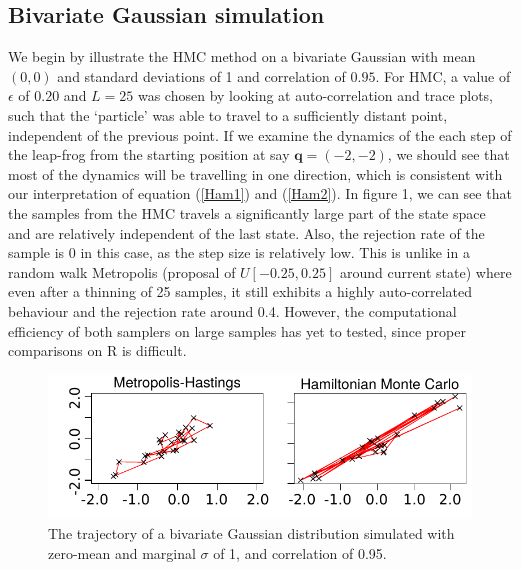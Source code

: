 \documentclass[11pt]{article}
\begin{document}
\subsection{Bivariate Gaussian simulation}
We begin by illustrate the HMC method on a bivariate Gaussian with mean $(0,0)$ and standard deviations of 1 and correlation of $0.95$. For HMC, a value of $\epsilon$ of $0.20$ and $L=25$ was chosen by looking at auto-correlation and trace plots, such that the `particle' was able to travel to a sufficiently distant point, independent of the previous point. If we examine the dynamics of the each step of the leap-frog from the starting position at say $\mathbf{q}=(-2,-2)$, we should see that most of the dynamics will be travelling in one direction, which is consistent with our interpretation of equation (\ref{Ham1}) and (\ref{Ham2}). In figure 1, we can see that the samples from the HMC travels a significantly large part of the state space and are relatively independent of the last state. Also, the rejection rate of the sample is 0 in this case, as the step size is relatively low. This is unlike in a random walk Metropolis (proposal of $U[-0.25,0.25]$ around current state) where even after a thinning of 25 samples, it still exhibits a highly auto-correlated behaviour and the rejection rate around 0.4. However, the computational efficiency of both samplers on large samples has yet to tested, since proper comparisons on R is difficult.
\begin{figure}[H]
\center
  \includegraphics[width=5in]{images/MHvsHM_explore.pdf}
\caption{The trajectory of a bivariate Gaussian distribution simulated with zero-mean and marginal $\sigma$ of 1, and correlation of 0.95.}
\end{figure}
\end{document}
